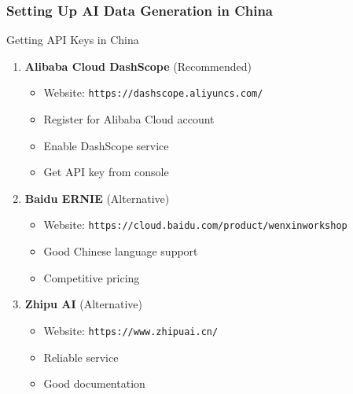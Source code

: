 \documentclass[aspectratio=169]{beamer}
\begin{document}
\begin{frame}
\frametitle{Setting Up AI Data Generation in China}
\begin{alertblock}{Getting API Keys in China}
\begin{enumerate}
\item \textbf{Alibaba Cloud DashScope} (Recommended)
\begin{itemize}
\item Website: \texttt{https://dashscope.aliyuncs.com/}
\item Register for Alibaba Cloud account
\item Enable DashScope service
\item Get API key from console
\end{itemize}
\item \textbf{Baidu ERNIE} (Alternative)
\begin{itemize}
\item Website: \texttt{https://cloud.baidu.com/product/wenxinworkshop}
\item Good Chinese language support
\item Competitive pricing
\end{itemize}
\item \textbf{Zhipu AI} (Alternative)
\begin{itemize}
\item Website: \texttt{https://www.zhipuai.cn/}
\item Reliable service
\item Good documentation
\end{itemize}
\end{enumerate}
\end{alertblock}
\end{frame}
\end{document}
